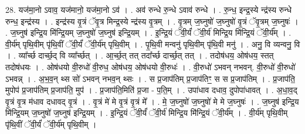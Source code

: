 \documentclass[17pt]{extarticle}
\begin{document}
28. यज॑मा॒नो ऽवाव॒ यज॑मानो॒ यज॑मा॒नो ऽव॑ । . अव॑ रुन्धे रु॒न्धे ऽवाव॑ रुन्धे । . रु॒न्ध॒ इन्द्र॒स्ये न्द्र॑स्य रुन्धे रुन्ध॒ इन्द्र॑स्य । . इन्द्र॑स्य वृ॒त्रं ॅवृ॒त्र मिन्द्र॒स्ये न्द्र॑स्य वृ॒त्रम् । . वृ॒त्रम् ज॒घ्नुषो॑ ज॒घ्नुषो॑ वृ॒त्रं ॅवृ॒त्रम् ज॒घ्नुषः॑ । . ज॒घ्नुष॑ इन्द्रि॒य मि॑न्द्रि॒यम् ज॒घ्नुषो॑ ज॒घ्नुष॑ इन्द्रि॒यम् । . इ॒न्द्रि॒यं ॅवी॒र्यं॑ ॅवी॒र्य॑ मिन्द्रि॒य मि॑न्द्रि॒यं ॅवी॒र्य᳚म् । . वी॒र्य॑म् पृथि॒वीम् पृ॑थि॒वीं ॅवी॒र्यं॑ ॅवी॒र्य॑म् पृथि॒वीम् । . पृ॒थि॒वी मन्वनु॑ पृथि॒वीम् पृ॑थि॒वी मनु॑ । . अनु॒ वि व्यन्वनु॒ वि । . व्या᳚र्च्छ दार्च्छ॒द् वि व्या᳚र्च्छत् । . आ॒र्च्छ॒त् तत् तदा᳚र्च्छ दार्च्छ॒त् तत् । . तदोष॑धय॒ ओष॑धय॒ स्तत् तदोष॑धयः । . ओष॑धयो वी॒रुधो॑ वी॒रुध॒ ओष॑धय॒ ओष॑धयो वी॒रुधः॑ । . वी॒रुधो॑ ऽभवन् नभवन्. वी॒रुधो॑ वी॒रुधो॑ ऽभवन्न् । . अ॒भ॒व॒न् थ्स सो॑ ऽभवन् नभव॒न् थ्सः । . स प्र॒जाप॑तिम् प्र॒जाप॑तिꣳ॒॒ स स प्र॒जाप॑तिम् । . प्र॒जाप॑ति॒ मुपोप॑ प्र॒जाप॑तिम् प्र॒जाप॑ति॒ मुप॑ । . प्र॒जाप॑ति॒मिति॑ प्र॒जा - प॒ति॒म् । . उपा॑धाव दधाव॒ दुपोपा॑धावत् । . अ॒धा॒व॒द् वृ॒त्रं वृ॒त्र म॑धाव दधावद् वृ॒त्रं । . वृ॒त्रं मे॑ मे वृ॒त्रं वृ॒त्रं मे᳚ । . मे॒ ज॒घ्नुषो॑ ज॒घ्नुषो॑ मे मे ज॒घ्नुषः॑ । . ज॒घ्नुष॑ इन्द्रि॒य मि॑न्द्रि॒यम् ज॒घ्नुषो॑ ज॒घ्नुष॑ इन्द्रि॒यम् । . इ॒न्द्रि॒यं ॅवी॒र्यं॑ ॅवी॒र्य॑ मिन्द्रि॒य मि॑न्द्रि॒यं ॅवी॒र्य᳚म् । . वी॒र्य॑म् पृथि॒वीम् पृ॑थि॒वीं ॅवी॒र्यं॑ ॅवी॒र्य॑म् पृथि॒वीम् । \newline
\end{document}
